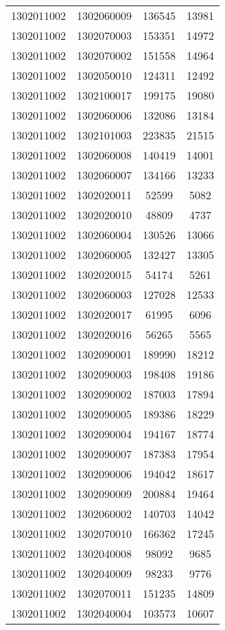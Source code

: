 \begin{longtable}[h]{llcc}
		1302011002 & 1302060009 & 136545 & 13981\\
		1302011002 & 1302070003 & 153351 & 14972\\
		1302011002 & 1302070002 & 151558 & 14964\\
		1302011002 & 1302050010 & 124311 & 12492\\
		1302011002 & 1302100017 & 199175 & 19080\\
		1302011002 & 1302060006 & 132086 & 13184\\
		1302011002 & 1302101003 & 223835 & 21515\\
		1302011002 & 1302060008 & 140419 & 14001\\
		1302011002 & 1302060007 & 134166 & 13233\\
		1302011002 & 1302020011 & 52599 & 5082\\
		1302011002 & 1302020010 & 48809 & 4737\\
		1302011002 & 1302060004 & 130526 & 13066\\
		1302011002 & 1302060005 & 132427 & 13305\\
		1302011002 & 1302020015 & 54174 & 5261\\
		1302011002 & 1302060003 & 127028 & 12533\\
		1302011002 & 1302020017 & 61995 & 6096\\
		1302011002 & 1302020016 & 56265 & 5565\\
		1302011002 & 1302090001 & 189990 & 18212\\
		1302011002 & 1302090003 & 198408 & 19186\\
		1302011002 & 1302090002 & 187003 & 17894\\
		1302011002 & 1302090005 & 189386 & 18229\\
		1302011002 & 1302090004 & 194167 & 18774\\
		1302011002 & 1302090007 & 187383 & 17954\\
		1302011002 & 1302090006 & 194042 & 18617\\
		1302011002 & 1302090009 & 200884 & 19464\\
		1302011002 & 1302060002 & 140703 & 14042\\
		1302011002 & 1302070010 & 166362 & 17245\\
		1302011002 & 1302040008 & 98092 & 9685\\
		1302011002 & 1302040009 & 98233 & 9776\\
		1302011002 & 1302070011 & 151235 & 14809\\
		1302011002 & 1302040004 & 103573 & 10607\\

\end{longtable}

